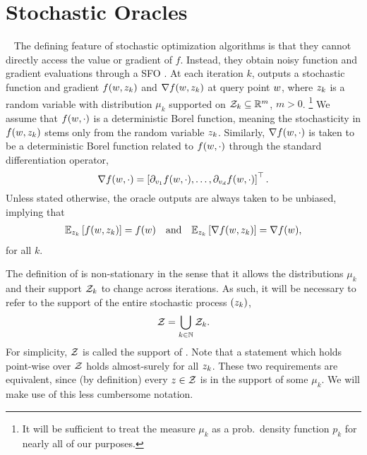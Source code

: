 \section{Stochastic Oracles}~\label{sec:stochastic-oracles}
The defining feature of stochastic optimization algorithms is that they cannot directly access the value or gradient of \( f \).
Instead, they obtain noisy function and gradient evaluations through a \ac{SFO}  \oracle. 
At each iteration \( k \), \oracle{} outputs a stochastic function and gradient \( f(w, z_{k}) \) and \( \nabla f(w, z_{k}) \) at query point \( w \), where \( z_{k} \) is a random variable with distribution \( \mu_k \) supported on \( \mathcal{Z}_k \subseteq \mathbb{R}^m \), \( m > 0 \).%
\footnote{It will be sufficient to treat the measure \( \mu_k \) as a prob.\ density function \( p_k \) for nearly all of our purposes.}
We assume that \( f(w, \cdot) \) is a deterministic Borel function, meaning the stochasticity in \( f(w, z_{k}) \) stems only from the random variable \( z_{k} \).
Similarly, \( \nabla f(w, \cdot) \) is taken to be a deterministic Borel function related to \( f(w, \cdot) \) through the standard differentiation operator,
\[ \nabla f(w, \cdot) = \left[\partial_{v_1} f(w, \cdot), \ldots, \partial_{v_d} f(w, \cdot)\right]^\top. \]
Unless stated otherwise, the oracle outputs are always taken to be unbiased, implying that 
\begin{align*}
    \mathbb{E}_{z_{k}} \left[f(w, z_{k})\right] = f(w) \quad \text{and} \quad \mathbb{E}_{z_{k}} \left[\nabla f(w, z_{k})\right] = \nabla f(w), 
\end{align*}
for all \( k \).

The definition of \oracle{} is non-stationary in the sense that it allows the distributions \( \mu_k \) and their support \( \mathcal{Z}_k \) to change across iterations.
As such, it will be necessary to refer to the support of the entire stochastic process \( \left(z_{k}\right) \), 
\[ \mathcal{Z} = \bigcup_{k\in \mathbb{N}} \mathcal{Z}_k. \]
For simplicity, \( \mathcal{Z} \) is called the support of \oracle{}. 
Note that a statement which holds point-wise over \( \mathcal{Z} \) holds almost-surely for all \( z_{k} \).
These two requirements are equivalent, since (by definition) every \( z \in \mathcal{Z} \) is in the support of some \( \mu_k \).
We will make use of this less cumbersome notation. 

